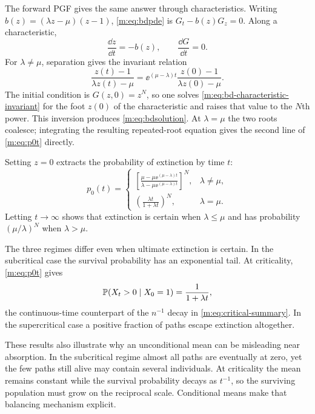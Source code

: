 The forward PGF gives the same answer through characteristics.  Writing
$b(z)=(\lambda z-\mu)(z-1)$, \cref{m:eq:bdpde} is
$G_t-b(z)G_z=0$.  Along a characteristic,
\begin{equation}
  \frac{\dd z}{\dd t}=-b(z),
  \qquad
  \frac{\dd G}{\dd t}=0.
  \label{m:eq:bd-characteristic-system}
\end{equation}
For $\lambda\neq\mu$, separation gives the invariant relation
\begin{equation}
  \frac{z(t)-1}{\lambda z(t)-\mu}
  =\ee^{(\mu-\lambda)t}
   \frac{z(0)-1}{\lambda z(0)-\mu}.
  \label{m:eq:bd-characteristic-invariant}
\end{equation}
The initial condition is $G(z,0)=z^N$, so one solves
\cref{m:eq:bd-characteristic-invariant} for the foot $z(0)$ of the
characteristic and raises that value to the $N$th power.  This inversion produces
\cref{m:eq:bdsolution}.  At $\lambda=\mu$ the two roots coalesce; integrating
the resulting repeated-root equation gives the second line of
\cref{m:eq:p0t} directly.

Setting $z=0$ extracts the probability of extinction by time $t$:
\begin{equation}
  p_0(t)=
  \begin{cases}
  \displaystyle
  \left[
  \frac{\mu-\mu\ee^{(\mu-\lambda)t}}
       {\lambda-\mu\ee^{(\mu-\lambda)t}}
  \right]^N,&\lambda\neq\mu,\\[12pt]
  \displaystyle\left(\frac{\lambda t}{1+\lambda t}\right)^N,
       &\lambda=\mu.
  \end{cases}
  \label{m:eq:p0t}
\end{equation}
Letting $t\to\infty$ shows that extinction is certain when $\lambda\leq\mu$ and
has probability $(\mu/\lambda)^N$ when $\lambda>\mu$.

The three regimes differ even when ultimate extinction is certain.  In the
subcritical case the survival probability has an exponential tail.  At
criticality, \cref{m:eq:p0t} gives
\begin{equation}
  \mathbb{P}\!\left(X_t>0\mid X_0=1\right)=\frac{1}{1+\lambda t},
  \label{m:eq:ct-critical-survival}
\end{equation}
the continuous-time counterpart of the $n^{-1}$ decay in
\cref{m:eq:critical-summary}.  In the supercritical case a positive fraction of
paths escape extinction altogether.

These results also illustrate why an unconditional mean can be misleading near
absorption.  In the subcritical regime almost all paths are eventually at zero,
yet the few paths still alive may contain several individuals.  At criticality
the mean remains constant while the survival probability decays as $t^{-1}$, so
the surviving population must grow on the reciprocal scale.  Conditional means
make that balancing mechanism explicit.

